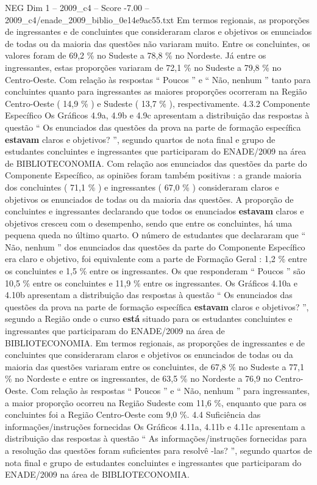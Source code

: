 \begin{textsample}{NEG Dim 1 – 2009\_c4 – Score -7.00 – 2009\_c4/enade\_2009\_biblio\_0e14e9ac55.txt}
Em termos regionais, as proporções de ingressantes e de concluintes que consideraram claros e objetivos os enunciados de todas ou da maioria das questões não variaram muito.
Entre os concluintes, os valores foram de 69,2 \% no Sudeste a 78,8 \% no Nordeste.
Já entre os ingressantes, estas proporções variaram de 72,1 \% no Sudeste a 79,8 \% no Centro-Oeste.
Com relação às respostas “ Poucos ” e “ Não, nenhum ” tanto para concluintes quanto para ingressantes as maiores proporções ocorreram na Região Centro-Oeste ( 14,9 \% ) e Sudeste ( 13,7 \% ), respectivamente. 4.3.2 Componente Específico Os Gráficos 4.9a, 4.9b e 4.9c apresentam a distribuição das respostas à questão “ Os enunciados das questões da prova na parte de formação específica \textbf{estavam} claros e objetivos? ”, segundo quartos de nota final e grupo de estudantes concluintes e ingressantes que participaram do ENADE/2009 na área de BIBLIOTECONOMIA.
Com relação aos enunciados das questões da parte do Componente Específico, as opiniões foram também positivas : a grande maioria dos concluintes ( 71,1 \% ) e ingressantes ( 67,0 \% ) consideraram claros e objetivos os enunciados de todas ou da maioria das questões.
A proporção de concluintes e ingressantes declarando que todos os enunciados \textbf{estavam} claros e objetivos cresceu com o desempenho, sendo que entre os concluintes, há uma pequena queda no último quarto.
O número de estudantes que declararam que “ Não, nenhum ” dos enunciados das questões da parte do Componente Específico era claro e objetivo, foi equivalente com a parte de Formação Geral : 1,2 \% entre os concluintes e 1,5 \% entre os ingressantes.
Os que responderam “ Poucos ” são 10,5 \% entre os concluintes e 11,9 \% entre os ingressantes.
Os Gráficos 4.10a e 4.10b apresentam a distribuição das respostas à questão “ Os enunciados das questões da prova na parte de formação específica \textbf{estavam} claros e objetivos? ”, segundo a Região onde o curso \textbf{está} situado para os estudantes concluintes e ingressantes que participaram do ENADE/2009 na área de BIBLIOTECONOMIA.
Em termos regionais, as proporções de ingressantes e de concluintes que consideraram claros e objetivos os enunciados de todas ou da maioria das questões variaram entre os concluintes, de 67,8 \% no Sudeste a 77,1 \% no Nordeste e entre os ingressantes, de 63,5 \% no Nordeste a 76,9 no Centro-Oeste.
Com relação às respostas “ Poucos ” e “ Não, nenhum ” para ingressantes, a maior proporção ocorreu na Região Sudeste com 11,6 \%, enquanto que para os concluintes foi a Região Centro-Oeste com 9,0 \%. 4.4 Suficiência das informações/instruções fornecidas Os Gráficos 4.11a, 4.11b e 4.11c apresentam a distribuição das respostas à questão “ As informações/instruções fornecidas para a resolução das questões foram suficientes para resolvê -las? ”, segundo quartos de nota final e grupo de estudantes concluintes e ingressantes que participaram do ENADE/2009 na área de BIBLIOTECONOMIA.

\end{textsample}
